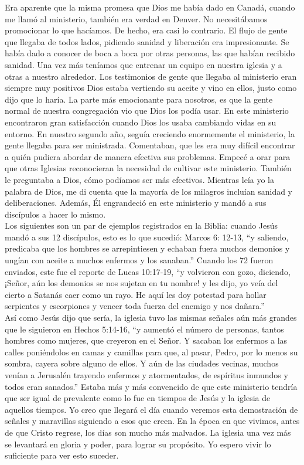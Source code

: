 \documentclass[twoside, 12pt]{book}
\begin{document}
Era aparente que la misma promesa que Dios me había dado en Canadá, cuando me llamó al ministerio, también era verdad en Denver. No necesitábamos promocionar lo que hacíamos. De hecho, era casi lo contrario. El flujo de gente que llegaba de todos lados, pidiendo sanidad y liberación era impresionante. Se había dado a conocer de boca a boca por otras personas, las que habían recibido sanidad. Una vez más teníamos que entrenar un equipo en nuestra iglesia y a otras a nuestro alrededor. Los testimonios de gente que llegaba al ministerio eran siempre muy positivos Dios estaba vertiendo su aceite y vino en ellos, justo como dijo que lo haría. La parte más emocionante para nosotros, es que la gente normal de nuestra congregación vio que Dios los podía usar. En este ministerio encontraron gran satisfacción cuando Dios los usaba cambiando vidas en su entorno. En nuestro segundo año, seguía creciendo enormemente el ministerio, la gente llegaba para ser ministrada. Comentaban, que les era muy difícil encontrar a  quién pudiera abordar de manera efectiva sus problemas. Empecé a orar para que otras Iglesias reconocieran la necesidad de cultivar este ministerio. También le preguntaba a Dios, cómo podíamos ser más efectivos. Mientras leía yo la palabra de Dios, me di cuenta que la mayoría de los milagros incluían sanidad y deliberaciones. Además, Él engrandeció en este ministerio y mandó a sus discípulos a hacer lo mismo.\\

Los siguientes son un par de ejemplos registrados en la Biblia: cuando Jesús mandó a sus 12 discípulos, esto es lo que sucedió: Marcos 6: 12-13, “y saliendo, predicaba que los hombres se arrepintiesen y echaban fuera muchos demonios y ungían con aceite a muchos enfermos y los sanaban.” Cuando los 72 fueron enviados, este fue el reporte de Lucas 10:17-19, “y volvieron con gozo, diciendo, ¡Señor, aún los demonios se nos sujetan en tu nombre! y les dijo, yo veía del cierto a Satanás caer como un rayo. He aquí les doy potestad para hollar serpientes y escorpiones y vencer toda fuerza del enemigo y nos dañara.”\\

Así como Jesús dijo que sería, la iglesia tuvo las mismas señales aún más grandes que le siguieron en Hechos 5:14-16, “y aumentó el número de personas, tantos hombres como mujeres, que creyeron en el Señor. Y sacaban los enfermos a las calles poniéndolos en camas y camillas para que, al pasar, Pedro, por lo menos su sombra, cayera sobre alguno de ellos. Y aún de las ciudades vecinas, muchos venían a Jerusalén trayendo enfermos y atormentados, de espíritus inmundos y todos eran sanados.”
Estaba más y más convencido de que este ministerio tendría que ser igual de prevalente como lo fue en tiempos de Jesús y la iglesia de aquellos tiempos. Yo creo que llegará el día cuando veremos esta demostración de señales y maravillas siguiendo a esos que creen. En la época en que vivimos, antes de que Cristo regrese, los días son mucho más malvados. La iglesia una vez más se levantará en gloria y poder, para lograr su propósito. Yo espero vivir lo suficiente para ver esto suceder.\\
\end{document}
